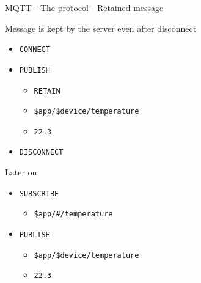 \begin{frame}[fragile]{MQTT - The protocol - Retained message}
\protect\hypertarget{mqtt---the-protocol---retained-message}{}

Message is kept by the server even after disconnect

\begin{itemize}
\tightlist
\item
  \texttt{CONNECT}
\item
  \texttt{PUBLISH}

  \begin{itemize}
  \tightlist
  \item
    \texttt{RETAIN}
  \item
    \texttt{\$app/\$device/temperature}
  \item
    \texttt{22.3}
  \end{itemize}
\item
  \texttt{DISCONNECT}
\end{itemize}

Later on:

\begin{itemize}
\tightlist
\item
  \texttt{SUBSCRIBE}

  \begin{itemize}
  \tightlist
  \item
    \texttt{\$app/\#/temperature}
  \end{itemize}
\item
  \texttt{PUBLISH}

  \begin{itemize}
  \tightlist
  \item
    \texttt{\$app/\$device/temperature}
  \item
    \texttt{22.3}
  \end{itemize}
\end{itemize}


\end{frame}

